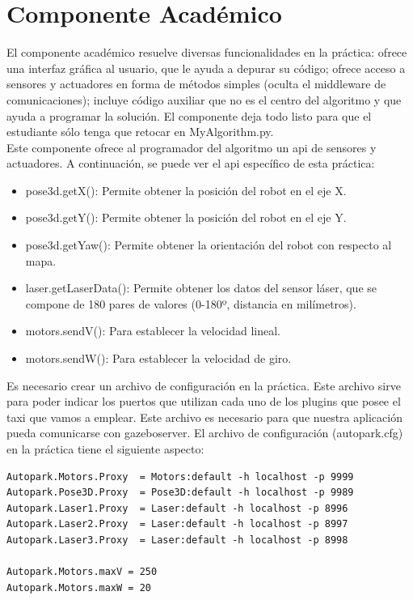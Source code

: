 \section{Componente Académico}
El componente académico resuelve diversas funcionalidades en la práctica: ofrece una interfaz gráfica al usuario, que le ayuda a depurar su código; ofrece acceso a sensores y actuadores en forma de métodos simples (oculta el middleware de comunicaciones); incluye código auxiliar que no es el centro del algoritmo y que ayuda a programar la solución. El componente deja todo listo para que el estudiante sólo tenga que retocar en MyAlgorithm.py.\\

Este componente ofrece al programador del algoritmo un \acrshort{api} de sensores y actuadores. A continuación, se puede ver el \acrshort{api} específico de esta práctica:

\begin{itemize}
\item pose3d.getX(): Permite obtener la posición del robot en el eje X.
\item	pose3d.getY(): Permite obtener la posición del robot en el eje Y.
\item	pose3d.getYaw(): Permite obtener la orientación del robot con respecto al mapa.
\item	laser.getLaserData(): Permite obtener los datos del sensor láser, que se compone de 180 pares de valores (0-180º, distancia en milímetros).
\item motors.sendV(): Para establecer la velocidad lineal.
\item	motors.sendW(): Para establecer la velocidad de giro.
\end{itemize}

Es necesario crear un archivo de configuración en la práctica. Este archivo sirve para poder indicar los puertos que utilizan cada uno de los plugins que posee el taxi que vamos a emplear. Este archivo es necesario para que nuestra aplicación pueda comunicarse con gazeboserver. El archivo de configuración (autopark.cfg) en la práctica tiene el siguiente aspecto:

\vspace{20pt}
	\begin{lstlisting}[frame=single]
Autopark.Motors.Proxy  = Motors:default -h localhost -p 9999
Autopark.Pose3D.Proxy  = Pose3D:default -h localhost -p 9989
Autopark.Laser1.Proxy  = Laser:default -h localhost -p 8996
Autopark.Laser2.Proxy  = Laser:default -h localhost -p 8997
Autopark.Laser3.Proxy  = Laser:default -h localhost -p 8998

Autopark.Motors.maxV = 250
Autopark.Motors.maxW = 20

	\end{lstlisting}



